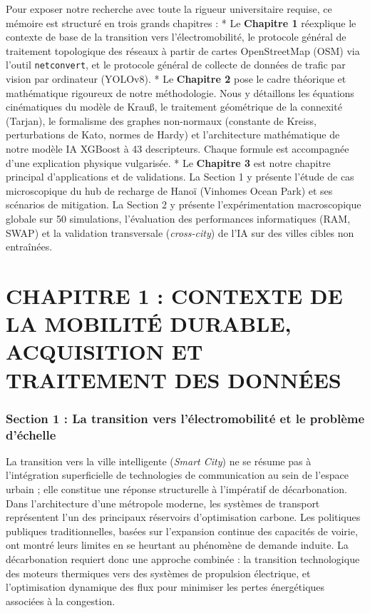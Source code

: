 \documentclass[10pt, a4paper]{article}
\begin{document}
Pour exposer notre recherche avec toute la rigueur universitaire
requise, ce mémoire est structuré en trois grands chapitres : * Le
\textbf{Chapitre 1} réexplique le contexte de base de la transition vers
l'électromobilité, le protocole général de traitement topologique des
réseaux à partir de cartes OpenStreetMap (OSM) via l'outil
\texttt{netconvert}, et le protocole général de collecte de données de
trafic par vision par ordinateur (YOLOv8). * Le \textbf{Chapitre 2} pose
le cadre théorique et mathématique rigoureux de notre méthodologie. Nous
y détaillons les équations cinématiques du modèle de Krauß, le
traitement géométrique de la connexité (Tarjan), le formalisme des
graphes non-normaux (constante de Kreiss, perturbations de Kato, normes
de Hardy) et l'architecture mathématique de notre modèle IA XGBoost à 43
descripteurs. Chaque formule est accompagnée d'une explication physique
vulgarisée. * Le \textbf{Chapitre 3} est notre chapitre principal
d'applications et de validations. La Section 1 y présente l'étude de cas
microscopique du hub de recharge de Hanoï (Vinhomes Ocean Park) et ses
scénarios de mitigation. La Section 2 y présente l'expérimentation
macroscopique globale sur 50 simulations, l'évaluation des performances
informatiques (RAM, SWAP) et la validation transversale
(\emph{cross-city}) de l'IA sur des villes cibles non entraînées.

\newpage

\section{CHAPITRE 1 : CONTEXTE DE LA MOBILITÉ DURABLE, ACQUISITION ET
TRAITEMENT DES
DONNÉES}\label{chapitre-1-contexte-de-la-mobilituxe9-durable-acquisition-et-traitement-des-donnuxe9es}

\subsubsection{Section 1 : La transition vers l'électromobilité et le
problème
d'échelle}\label{section-1-la-transition-vers-luxe9lectromobilituxe9-et-le-probluxe8me-duxe9chelle}

La transition vers la ville intelligente (\emph{Smart City}) ne se
résume pas à l'intégration superficielle de technologies de
communication au sein de l'espace urbain ; elle constitue une réponse
structurelle à l'impératif de décarbonation. Dans l'architecture d'une
métropole moderne, les systèmes de transport représentent l'un des
principaux réservoirs d'optimisation carbone. Les politiques publiques
traditionnelles, basées sur l'expansion continue des capacités de
voirie, ont montré leurs limites en se heurtant au phénomène de demande
induite. La décarbonation requiert donc une approche combinée : la
transition technologique des moteurs thermiques vers des systèmes de
propulsion électrique, et l'optimisation dynamique des flux pour
minimiser les pertes énergétiques associées à la congestion.
\end{document}
